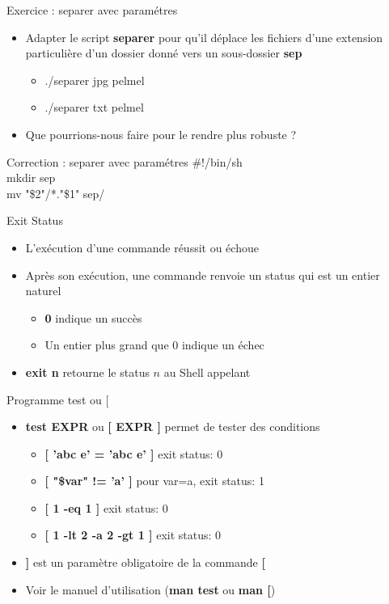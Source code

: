 \documentclass[xcolor=table]{beamer}
\begin{document}
\begin{frame}{Exercice : separer avec paramétres}
\begin{itemize}
    \item Adapter le script \textbf{separer} pour qu'il déplace les fichiers d'une extension particulière d'un dossier donné vers un sous-dossier \textbf{sep}
    \begin{itemize}
        \item ./separer jpg pelmel
        \item ./separer txt pelmel
    \end{itemize}
    \item Que pourrions-nous faire pour le rendre plus robuste ?
\end{itemize}
\end{frame}

\begin{frame}{Correction : separer avec paramétres}
\#!/bin/sh\\
mkdir sep\\
mv "\$2"/*."\$1" sep/
\end{frame}

\begin{frame}{Exit Status}
\begin{itemize}
    \item L'exécution d'une commande réussit ou échoue
    \item Après son exécution, une commande renvoie un status qui est un entier naturel
    \begin{itemize}
        \item \textbf{0} indique un succès
        \item Un entier plus grand que 0 indique un échec
    \end{itemize}
    \item \textbf{exit n} retourne le status $n$ au Shell appelant
\end{itemize}
\end{frame}

\begin{frame}{Programme test ou [}
\begin{itemize}
    \item \textbf{test EXPR} ou \textbf{[ EXPR ]} permet de tester des conditions
    \begin{itemize}
        \item \textbf{[ 'abc e' = 'abc e' ]} \quad exit status: 0
        \item \textbf{[ "\$var" != 'a' ]} \quad pour var=a, exit status: 1
        \item \textbf{[ 1 -eq 1 ]} \quad exit status: 0
        \item \textbf{[ 1 -lt 2 -a 2 -gt 1 ]} \quad exit status: 0
    \end{itemize}
    \item \textbf{]} est un paramètre obligatoire de la commande \textbf{[}
    \item Voir le manuel d'utilisation (\textbf{man test} ou \textbf{man [})
\end{itemize}
\end{frame}
\end{document}
